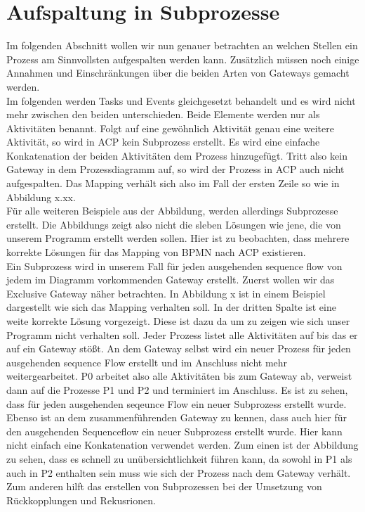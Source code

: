\section {Aufspaltung in Subprozesse}
Im folgenden Abschnitt wollen wir nun genauer betrachten an welchen Stellen ein Prozess am Sinnvollsten aufgespalten werden kann. Zusätzlich müssen noch einige Annahmen und Einschränkungen über die beiden Arten von Gateways gemacht werden.\\
Im folgenden werden Tasks und Events gleichgesetzt behandelt und es wird nicht mehr zwischen den beiden unterschieden. Beide Elemente werden nur als Aktivitäten benannt. Folgt auf eine gewöhnlich Aktivität genau eine weitere Aktivität, so wird in ACP kein Subprozess erstellt. Es wird eine einfache Konkatenation der beiden Aktivitäten dem Prozess hinzugefügt. Tritt also kein Gateway in dem Prozessdiagramm auf, so wird der Prozess in ACP auch nicht aufgespalten. Das Mapping verhält sich also im Fall der ersten Zeile so wie in Abbildung x.xx.\\
Für alle weiteren Beispiele aus der Abbildung, werden allerdings Subprozesse erstellt. Die Abbildungs zeigt also nicht die sleben Lösungen wie jene, die von unserem Programm erstellt werden sollen. Hier ist zu beobachten, dass mehrere korrekte Lösungen für das Mapping von BPMN nach ACP existieren.\\
Ein Subprozess wird in unserem Fall für jeden ausgehenden sequence flow von jedem im Diagramm vorkommenden Gateway erstellt. Zuerst wollen wir das Exclusive Gateway näher betrachten. In Abbildung x ist in einem Beispiel dargestellt wie sich das Mapping verhalten soll. In der dritten Spalte ist eine weite korrekte Lösung vorgezeigt. Diese ist dazu da um zu zeigen wie sich unser Programm nicht verhalten soll. Jeder Prozess listet alle Aktivitäten auf bis das er auf ein Gateway stößt. An dem Gateway selbst wird ein neuer Prozess für jeden ausgehenden sequence Flow erstellt und im Anschluss nicht mehr weitergearbeitet. P0 arbeitet also alle Aktivitäten bis zum Gateway ab, verweist dann auf die Prozesse P1 und P2 und terminiert im Anschluss. Es ist zu sehen, dass für jeden ausgehenden seqeunce Flow ein neuer Subprozess erstellt wurde.\\ 
Ebenso ist an dem zusammenführenden Gateway zu kennen, dass auch hier für den ausgehenden Sequenceflow ein neuer Subprozess erstellt wurde. Hier kann nicht einfach eine Konkatenation verwendet werden. Zum einen ist der Abbildung zu sehen, dass es schnell zu unübersichtlichkeit führen kann, da sowohl in P1 als auch in P2 enthalten sein muss wie sich der Prozess nach dem Gateway verhält. Zum anderen hilft das erstellen von Subprozessen bei der Umsetzung von Rückkopplungen und Rekusrionen.\\
